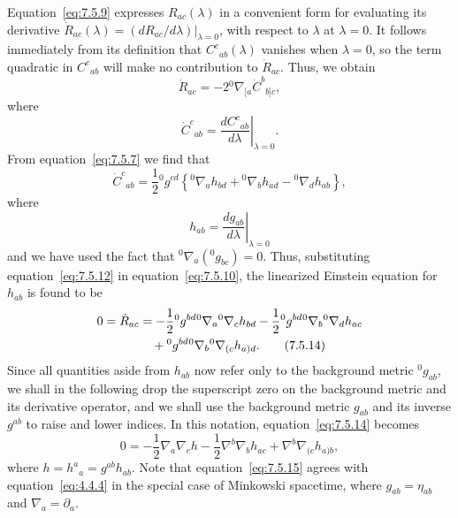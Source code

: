 Equation~\eqref{eq:7.5.9} expresses \(R_{ac}(\lambda)\) in a convenient form for
evaluating its derivative
\(\dot R_{ac}(\lambda)=(dR_{ac}/d\lambda)|_{\lambda=0}\), with respect to
\(\lambda\) at \(\lambda=0\). It follows immediately from its definition that
\(C^c{}_{ab}(\lambda)\) vanishes when \(\lambda=0\), so the term quadratic in
\(C^c{}_{ab}\) will make no contribution to \(\dot R_{ac}\). Thus, we obtain
\begin{equation}
  \dot R_{ac}
    =-2{}^{0}\nabla_{[a}\dot C^b{}_{b]c} ,
  \tag{7.5.10}\label{eq:7.5.10}
\end{equation}
where
\begin{equation}
  \dot C^c{}_{ab}
    =\left.\frac{dC^c{}_{ab}}{d\lambda}\right|_{\lambda=0} .
  \tag{7.5.11}\label{eq:7.5.11}
\end{equation}
From equation~\eqref{eq:7.5.7} we find that
\begin{equation}
  \dot C^c{}_{ab}
    =\frac12{}^{0}g^{cd}
      \left\{
        {}^{0}\nabla_ah_{bd}
        +{}^{0}\nabla_bh_{ad}
        -{}^{0}\nabla_dh_{ab}
      \right\} ,
  \tag{7.5.12}\label{eq:7.5.12}
\end{equation}
where
\begin{equation}
  h_{ab}
    =\left.\frac{dg_{ab}}{d\lambda}\right|_{\lambda=0}
  \tag{7.5.13}\label{eq:7.5.13}
\end{equation}
and we have used the fact that
\({}^{0}\nabla_a({}^{0}g_{bc})=0\). Thus, substituting
equation~\eqref{eq:7.5.12} in equation~\eqref{eq:7.5.10}, the linearized Einstein
equation for \(h_{ab}\) is found to be
\begin{align}
  0=\dot R_{ac}
    &=-\frac12{}^{0}g^{bd}
        {}^{0}\nabla_a{}^{0}\nabla_ch_{bd}
      -\frac12{}^{0}g^{bd}
        {}^{0}\nabla_b{}^{0}\nabla_dh_{ac} \notag\\
    &\quad+{}^{0}g^{bd}
        {}^{0}\nabla_b{}^{0}\nabla_{(c}h_{a)d} .
  \tag{7.5.14}\label{eq:7.5.14}
\end{align}
Since all quantities aside from \(h_{ab}\) now refer only to the background metric
\({}^{0}g_{ab}\), we shall in the following drop the superscript zero on the
background metric and its derivative operator, and we shall use the background
metric \(g_{ab}\) and its inverse \(g^{ab}\) to raise and lower indices. In this
notation, equation~\eqref{eq:7.5.14} becomes
\begin{equation}
  0=-\frac12\nabla_a\nabla_ch
    -\frac12\nabla^b\nabla_bh_{ac}
    +\nabla^b\nabla_{(c}h_{a)b} ,
  \tag{7.5.15}\label{eq:7.5.15}
\end{equation}
where \(h=h^a{}_a=g^{ab}h_{ab}\). Note that equation~\eqref{eq:7.5.15} agrees
with equation~\eqref{eq:4.4.4} in the special case of Minkowski spacetime, where
\(g_{ab}=\eta_{ab}\) and \(\nabla_a=\partial_a\).

